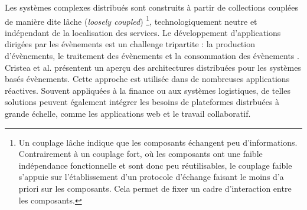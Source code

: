 Les systèmes complexes distribués sont construits à partir de collections 
couplées de manière dite \og lâche\fg{} (\textit{loosely coupled}) \footnote{Un 
	couplage lâche indique que les 
	composants échangent peu d'informations. Contrairement à un couplage fort, où 
	les 
	composants ont une faible indépendance fonctionnelle et sont donc peu 
	réutilisables, le couplage faible s'appuie sur l'établissement d'un protocole 
	d'échange faisant le moins d'a priori sur les composants. Cela permet de fixer 
	un 
	cadre d'interaction entre les composants.}, technologiquement neutre 
et indépendant de la localisation des services. 
Le développement d'applications dirigées par les évènements est un challenge 
tripartite : la production d'évènements, le traitement des évènements et la 
consommation des évènements \cite{Chandy2011}.
Cristea et al. \cite{Cristea2011} présentent un aperçu des architectures distribuées 
pour les systèmes basés évènements. 
Cette approche est utilisée dans de nombreuses applications réactives. Souvent 
appliquées à la finance ou aux systèmes logistiques, de telles solutions peuvent 
également intégrer les besoins de plateformes distrbuées à grande échelle, comme 
les applications web et le travail collaboratif.

